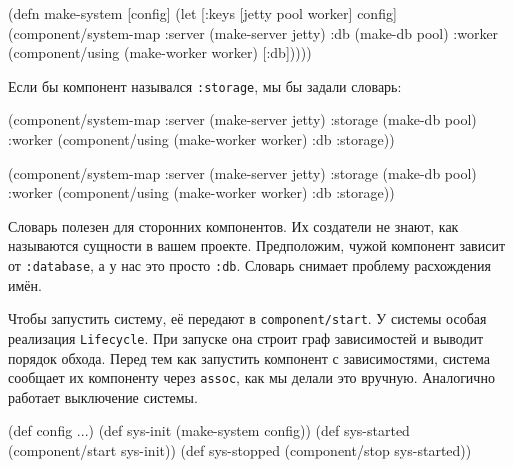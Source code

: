 \else

\begin{english}
  \begin{clojure}
(defn make-system
  [config]
  (let [{:keys [jetty pool worker]} config]
    (component/system-map
     :server (make-server jetty)
     :db     (make-db pool)
     :worker (component/using
              (make-worker worker) [:db]))))
  \end{clojure}
\end{english}

\fi


\noindent
Если бы компонент назывался \verb|:storage|, мы бы задали словарь:

\ifx\DEVICETYPE\MOBILE

\begin{english}
  \begin{clojure}
(component/system-map
 :server  (make-server jetty)
 :storage (make-db pool)
 :worker  (component/using
            (make-worker worker)
            {:db :storage}))
  \end{clojure}
\end{english}

\else

\begin{english}
  \begin{clojure}
(component/system-map
 :server  (make-server jetty)
 :storage (make-db pool)
 :worker  (component/using
           (make-worker worker) {:db :storage}))
  \end{clojure}
\end{english}

\fi

Словарь полезен для сторонних компонентов. Их создатели не знают, как называются
сущности в вашем проекте. Предположим, чужой компонент зависит от
\verb|:database|, а у нас это просто \verb|:db|. Словарь снимает проблему
расхождения имён.

Чтобы запустить систему, её передают в \verb|component/start|. У системы
особая реализация \verb|Lifecycle|. При запуске она строит граф зависимостей и
выводит порядок обхода. Перед тем как запустить компонент с зависимостями,
система сообщает их компоненту через \verb|assoc|, как мы делали это
вручную. Аналогично работает выключение системы.

\ifx\DEVICETYPE\MOBILE

\begin{english}
  \begin{clojure}
(def config {...})
(def sys-init (make-system config))
(def sys-started
  (component/start sys-init))
(def sys-stopped
  (component/stop sys-started))
  \end{clojure}
\end{english}

